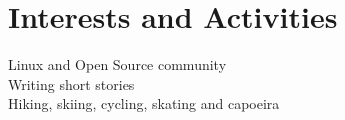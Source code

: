 \documentclass[a4paper,10pt]{article}
\begin{document}

\section{Interests and Activities}

Linux and Open Source community \\
Writing short stories\\
Hiking, skiing, cycling, skating and capoeira

\end{document}
